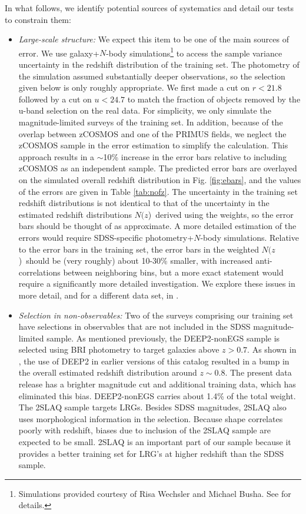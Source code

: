 \documentclass[12pt,preprint]{aastex}
\newcommand{\nofz}{$N(z$)}
\begin{document}
In what follows, we identify potential sources of systematics and detail our
tests to constrain them:

\begin{itemize}

\item {\it Large-scale structure: } We expect this item to be one of the main
sources of error.  We use galaxy+$N$-body simulations\footnote{Simulations
provided courtesy of Risa Wechsler and Michael Busha. See
\cite{bushasimulations} for details.} to access the sample variance uncertainty
in the redshift distribution of the training set.  The photometry of the
simulation assumed substantially deeper observations, so the selection given
below is only roughly appropriate.  We first made a cut on $r<21.8$ followed by
a cut on $u<24.7$ to match the fraction of objects removed by the u-band
selection on the real data.  For simplicity, we only simulate the
magnitude-limited surveys of the training set.  In addition, because of the
overlap between zCOSMOS and one of the PRIMUS fields, we neglect the zCOSMOS
sample in the error estimation to simplify the calculation.  This approach
results in a $\sim$10\% increase in the error bars relative to including
zCOSMOS as an independent sample.  The predicted error bars are overlayed on
the simulated overall redshift distribution in Fig.  \ref{fig:ebars}, and the
values of the errors are given in Table \ref{tab:nofz}. The uncertainty in the
training set redshift distributions is not identical to that of the uncertainty
in the estimated redshift distributions \nofz\ derived using the weights, so
the error bars should be thought of as approximate.  A more detailed estimation
of the errors would require SDSS-specific photometry+$N$-body simulations.
Relative to the error bars in the training set, the error bars in the weighted
\nofz\ should be (very roughly) about 10-30\% smaller, with increased
anti-correlations between neighboring bins, but a more exact statement would
require a significantly more detailed investigation.  We explore these issues
in more detail, and for a different data set, in \citet{CunhaPhotozLSS11}.


\item {\it Selection in non-observables: } Two of the surveys comprising our
training set have selections in observables that are not included in the SDSS
magnitude-limited sample.  As mentioned previously, the DEEP2-nonEGS sample is
selected using BRI photometry to target galaxies above $z>0.7$.  As shown in
\citet{CunhaPhotoz09}, the use of DEEP2 in earlier versions of this catalog
resulted in a bump in the overall estimated redshift distribution around $z\sim
0.8$.  The present data release has a brighter magnitude cut and additional
training data, which has eliminated this bias.  
DEEP2-nonEGS carries about 1.4\% of the total weight.  The 2SLAQ sample targets
LRGs.  Besides SDSS magnitudes, 2SLAQ also uses morphological information in the
selection.  Because shape correlates poorly with redshift, biases due to inclusion of the
2SLAQ sample are expected to be small.  2SLAQ is an important part of our
sample because it provides a better training set for LRG's at higher redshift
than the SDSS sample.


\end{itemize}
\end{document}
